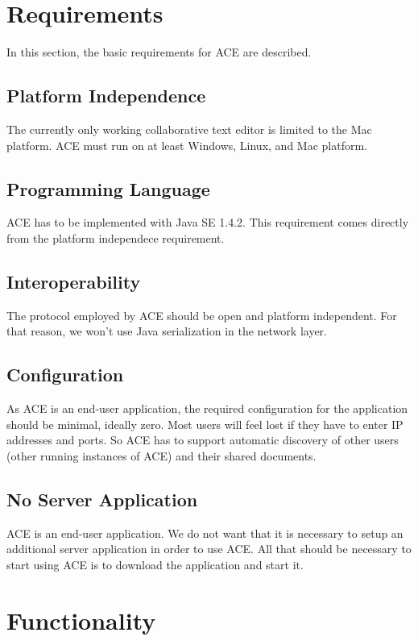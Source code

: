 \documentclass[11pt,a4paper]{article}
\begin{document}
\newpage
\section{Requirements}

In this section, the basic requirements for ACE are described.

\subsection{Platform Independence}
The currently only working collaborative text editor is limited to the Mac
platform. ACE must run on at least Windows, Linux, and Mac platform.

\subsection{Programming Language}
ACE has to be implemented with Java SE 1.4.2. This requirement comes directly
from the platform independece requirement.

\subsection{Interoperability}
The protocol employed by ACE should be open and platform independent. 
For that reason, we won't use Java serialization in the network layer.

\subsection{Configuration}
As ACE is an end-user application, the required configuration for the application should be 
minimal, ideally zero. Most users will feel lost if they have to enter IP addresses 
and ports. So ACE has to support automatic discovery of other users (other running instances 
of ACE) and their shared documents.

\subsection{No Server Application}
ACE is an end-user application. We do not want that it is necessary to setup
an additional server application in order to use ACE. All that should be
necessary to start using ACE is to download the application and start it.


\newpage
\section{Functionality}
\end{document}
